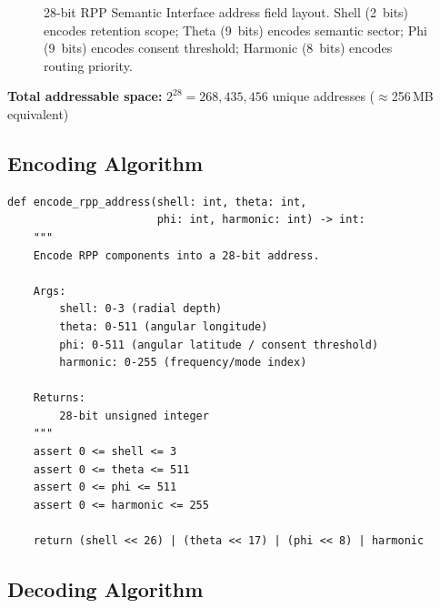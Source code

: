 \documentclass[11pt,a4paper]{article}
\begin{document}
\begin{figure}[h]
\centering
{}
\caption{28-bit RPP Semantic Interface address field layout. Shell (2~bits) encodes retention scope; Theta (9~bits) encodes semantic sector; Phi (9~bits) encodes consent threshold; Harmonic (8~bits) encodes routing priority.}
\label{fig:address-layout}
\end{figure}

\textbf{Total addressable space:} $2^{28} = 268{,}435{,}456$ unique addresses ($\approx$256\,MB equivalent)

\subsection{Encoding Algorithm}

\begin{lstlisting}[style=python,caption={RPP Address Encoding}]
def encode_rpp_address(shell: int, theta: int,
                       phi: int, harmonic: int) -> int:
    """
    Encode RPP components into a 28-bit address.

    Args:
        shell: 0-3 (radial depth)
        theta: 0-511 (angular longitude)
        phi: 0-511 (angular latitude / consent threshold)
        harmonic: 0-255 (frequency/mode index)

    Returns:
        28-bit unsigned integer
    """
    assert 0 <= shell <= 3
    assert 0 <= theta <= 511
    assert 0 <= phi <= 511
    assert 0 <= harmonic <= 255

    return (shell << 26) | (theta << 17) | (phi << 8) | harmonic
\end{lstlisting}

\subsection{Decoding Algorithm}
\end{document}
